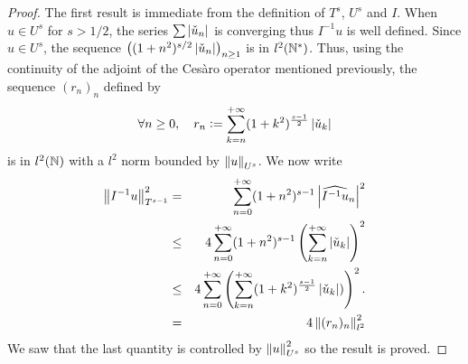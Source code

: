 \documentclass[a4paper]{article}
\begin{document}
\begin{proof}
	The first result is immediate from the definition of $T^s$, $U^s$ and $I$. 
	When $u \in U^{s}$ for $s > 1/2$, the series $\sum \left\lvert \check{u}_n \right\rvert$ is converging thus $I^{-1}u$ is well defined.
	Since $u \in U^s$, the sequence $\left((1+n^2)^{s/2} \left\lvert \check{u}_n \right\rvert\right)_{n \geq 1}$ is in $l^2(\mathbb{N}^*)$. Thus, using the continuity of the adjoint of the Cesàro operator mentioned previously, the sequence $(r_n)_n$ defined by 
	\[\forall n \geq 0, \quad r_n \mathrel{\mathop:}= \sum_{k=n}^{+ \infty} (1+k^2)^{\frac{s-1}{2}} \left\lvert \check{u}_k \right\rvert \] is in $l^2(\mathbb{N})$ with a $l^2$ norm bounded by $\left\|u\right\|_{U^s}$. We now write
	\begin{eqnarray*}
		\left\|I^{-1} u\right\|_{T^{s-1}}^2 &=& \sum_{n=0}^{+ \infty} (1 + n^2)^{s-1} \left\lvert \widehat{I^{-1} u}_n \right\rvert^2\\ 
		&\leq& 4\sum_{n=0}^{+\infty}(1+n^2)^{s-1} \left(\sum_{k=n}^{+\infty} \left\lvert \check{u}_k \right\rvert\right)^2 \\
		&\leq& 4\sum_{n=0}^{+ \infty}\left(\sum_{k=n}^{+\infty}(1+k^2)^{\frac{s-1}{2}} \left\lvert \check{u}_k \right\rvert)\right)^2.\\
		&=& 4\left\|(r_n)_n\right\|^2_{l^2}
	\end{eqnarray*}	
	We saw that the last quantity is controlled by $\left\|u\right\|_{U^s}^2$ so the result is proved.
\end{proof}
\noindent {}
\end{document}
